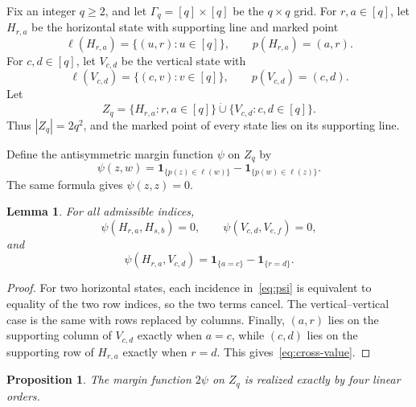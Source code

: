 \documentclass[12pt]{article}
\newtheorem{lemma}[theorem]{Lemma}
\newtheorem{proposition}[theorem]{Proposition}
\theoremstyle{remark}
\newcommand{\one}{\mathbf{1}}
\begin{document}
Fix an integer $q\ge2$, and let
$\Gamma_q=[q]\times[q]$
be the $q\times q$ grid.  For $r,a\in[q]$, let $H_{r,a}$ be the
horizontal state with supporting line and marked point
\[
  \ell(H_{r,a})=\{(u,r):u\in[q]\},
  \qquad
  p(H_{r,a})=(a,r).
\]
For $c,d\in[q]$, let $V_{c,d}$ be the vertical state with
\[
  \ell(V_{c,d})=\{(c,v):v\in[q]\},
  \qquad
  p(V_{c,d})=(c,d).
\]
Let
\[
  Z_q=\{H_{r,a}:r,a\in[q]\}\mathbin{\dot\cup}
      \{V_{c,d}:c,d\in[q]\}.
\]
Thus $|Z_q|=2q^2$, and the marked point of every state lies on its
supporting line.

Define the antisymmetric margin function $\psi$ on $Z_q$ by
\begin{equation}\label{eq:psi}
  \psi(z,w)=
  \one_{\{p(z)\in\ell(w)\}}-
  \one_{\{p(w)\in\ell(z)\}}.
\end{equation}
The same formula gives $\psi(z,z)=0$.

\begin{lemma}\label{lem:psi-values}
For all admissible indices,
\[
  \psi(H_{r,a},H_{s,b})=0,
  \qquad
  \psi(V_{c,d},V_{e,f})=0,
\]
and
\begin{equation}\label{eq:cross-value}
  \psi(H_{r,a},V_{c,d})=
  \one_{\{a=c\}}-\one_{\{r=d\}}.
\end{equation}
\end{lemma}

\begin{proof}
For two horizontal states, each incidence in~\eqref{eq:psi} is
equivalent to equality of the two row indices, so the two terms cancel.
The vertical--vertical case is the same with rows replaced by columns.
Finally, $(a,r)$ lies on the supporting column of $V_{c,d}$ exactly
when $a=c$, while $(c,d)$ lies on the supporting row of $H_{r,a}$
exactly when $r=d$.  This gives~\eqref{eq:cross-value}.
\end{proof}

\begin{proposition}\label{prop:four-orders}
The margin function $2\psi$ on $Z_q$ is realized exactly by four linear
orders.
\end{proposition}
\end{document}
